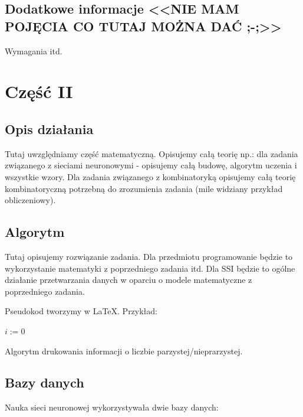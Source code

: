 \documentclass[12pt,a4paper]{article}
\begin{document}
	\subsection*{Dodatkowe informacje <<NIE MAM POJĘCIA CO TUTAJ MOŻNA DAĆ ;-;>>}
	Wymagania itd. 
	\newpage
	\section*{Część II}
	\subsection*{Opis działania} 
	Tutaj uwzględniamy część matematyczną. Opisujemy całą teorię np.:
	dla zadania związanego z sieciami neuronowymi - opisujemy całą budowę, algorytm uczenia i wszystkie wzory. Dla zadania związanego z kombinatoryką opisujemy całą teorię kombinatoryczną potrzebną do zrozumienia zadania (mile widziany przykład obliczeniowy).
	
	
	
	\subsection*{Algorytm}
	Tutaj opisujemy rozwiązanie zadania. Dla przedmiotu programowanie będzie to wykorzystanie matematyki z poprzedniego zadania itd. Dla SSI będzie to ogólne działanie przetwarzania danych w oparciu o modele matematyczne z poprzedniego zadania. 
	
	
	Pseudokod tworzymy w \LaTeX. Przykład:\\
	\begin{algorithm}[H]
		$i:=0$\;
		\caption{Algorytm drukowania informacji o liczbie parzystej/nieprarzystej.}
	\end{algorithm}

	\subsection*{Bazy danych}
	Nauka sieci neuronowej wykorzystywała dwie bazy danych:
\end{document}
